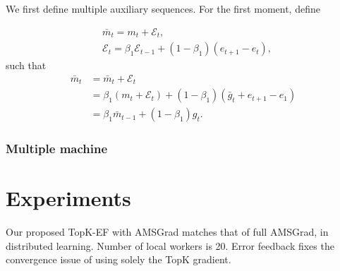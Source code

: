 \documentclass[11pt]{article}
\begin{document}
We first define multiple auxiliary sequences. For the first moment, define

\begin{align*}
    &\bar m_t=m_t+\mathcal E_t,\\   
    &\mathcal E_t=\beta_1\mathcal E_{t-1}+(1-\beta_1)(e_{t+1}-e_t),
\end{align*}
such that 
\begin{align*} 
    \bar m_t&=\bar m_t+\mathcal E_t\\
    &=\beta_1(m_t+\mathcal E_t)+(1-\beta_1)(\bar g_t+e_{t+1}-e_1)\\
    &=\beta_1\bar m_{t-1}+(1-\beta_1)g_t.
\end{align*}


\subsubsection{Multiple machine}


\section{Experiments}\label{sec:experiment}
Our proposed TopK-EF with AMSGrad matches that of full AMSGrad, in distributed learning. Number of local workers is 20. Error feedback fixes the convergence issue of using solely the TopK gradient. 
\end{document}

